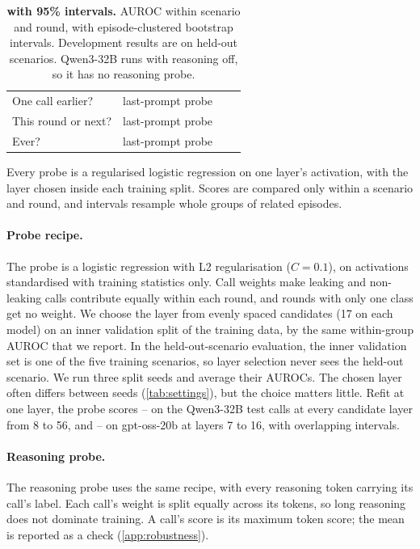 \begin{table}[ht]
\begin{tabular}{@{}llcc@{}}
    One call earlier? & last-prompt probe & \qwenStrictNextProbe{} \qwenStrictNextProbeCI{} & \gptossStrictNextProbe{} \gptossStrictNextProbeCI{} \\
    This round or next? & last-prompt probe & \qwenNearProbe{} \qwenNearProbeCI{} & \gptossNearProbe{} \gptossNearProbeCI{} \\
    Ever? & last-prompt probe & \qwenEverProbe{} \qwenEverProbeCI{} & \gptossEverProbe{} \gptossEverProbeCI{} \\
    \bottomrule
  \end{tabular}
  \caption{\textbf{ with 95\% intervals.} AUROC within scenario and round, with episode-clustered bootstrap intervals. Development results are on held-out scenarios. Qwen3-32B runs with reasoning off, so it has no reasoning probe.}
  \label{tab:glance-ci}
\end{table}

Every probe is a regularised logistic regression on one layer's activation, with the layer chosen inside each training split.
Scores are compared only within a scenario and round, and intervals resample whole groups of related episodes.

\paragraph{Probe recipe.}
The probe is a logistic regression with L2 regularisation ($C = 0.1$), on activations standardised with training statistics only.
Call weights make leaking and non-leaking calls contribute equally within each round, and rounds with only one class get no weight.
We choose the layer from evenly spaced candidates (17 on each model) on an inner validation split of the training data, by the same within-group AUROC that we report.
In the held-out-scenario evaluation, the inner validation set is one of the five training scenarios, so layer selection never sees the held-out scenario.
We run three split seeds and average their AUROCs.
The chosen layer often differs between seeds (\cref{tab:settings}), but the choice matters little.
Refit at one layer, the probe scores \eNineteenQwenLayerMidLow{}--\eNineteenQwenLayerMidHigh{} on the Qwen3-32B test calls at every candidate layer from 8 to 56, and \eNineteenGptLayerMidLow{}--\eNineteenGptLayerMidHigh{} on gpt-oss-20b at layers 7 to 16, with overlapping intervals.

\paragraph{Reasoning probe.}
The reasoning probe uses the same recipe, with every reasoning token carrying its call's label.
Each call's weight is split equally across its tokens, so long reasoning does not dominate training.
A call's score is its maximum token score; the mean is reported as a check (\cref{app:robustness}).

